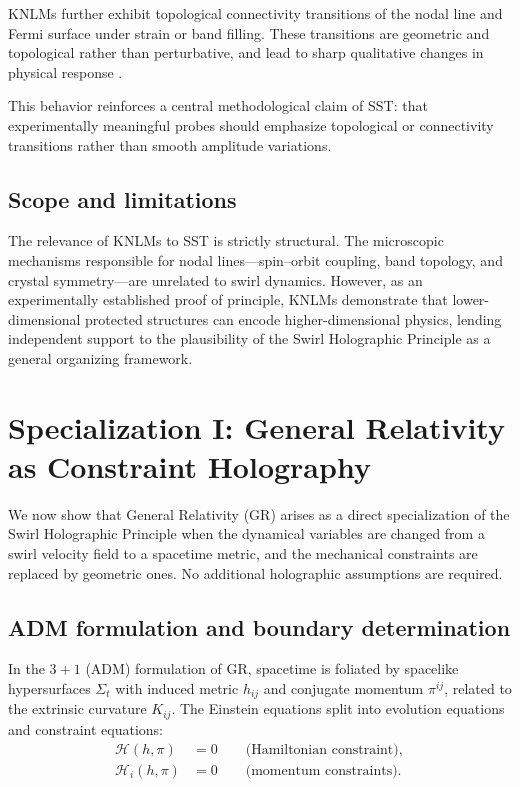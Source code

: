 \documentclass[11pt]{article}
\begin{document}
        KNLMs further exhibit topological connectivity transitions of the nodal line
        and Fermi surface under strain or band filling.
        These transitions are geometric and topological rather than perturbative,
        and lead to sharp qualitative changes in physical response
        \cite{Domaine2025NatCommOctdong,deJuan2017CPGE}.

        This behavior reinforces a central methodological claim of SST: that
        experimentally meaningful probes should emphasize topological or connectivity
        transitions rather than smooth amplitude variations.

    \subsection{Scope and limitations}

        The relevance of KNLMs to SST is strictly structural.
        The microscopic mechanisms responsible for nodal lines---spin--orbit
        coupling, band topology, and crystal symmetry---are unrelated to swirl
        dynamics.
        However, as an experimentally established proof of principle, KNLMs
        demonstrate that lower-dimensional protected structures can encode
        higher-dimensional physics, lending independent support to the plausibility
        of the Swirl Holographic Principle as a general organizing framework.

    \section{Specialization I: General Relativity as Constraint Holography}

    We now show that General Relativity (GR) arises as a direct specialization of the
    Swirl Holographic Principle when the dynamical variables are changed from a swirl
    velocity field to a spacetime metric, and the mechanical constraints are replaced
    by geometric ones. No additional holographic assumptions are required.

    \subsection{ADM formulation and boundary determination}

        In the $3+1$ (ADM) formulation of GR, spacetime is foliated by spacelike
        hypersurfaces $\Sigma_t$ with induced metric $h_{ij}$ and conjugate momentum
        $\pi^{ij}$, related to the extrinsic curvature $K_{ij}$. The Einstein equations
        split into evolution equations and constraint equations:
        \begin{align}
            \mathcal{H}(h,\pi) &= 0 \qquad \text{(Hamiltonian constraint)}, \\
            \mathcal{H}_i(h,\pi) &= 0 \qquad \text{(momentum constraints)}.
        \end{align}
\end{document}

